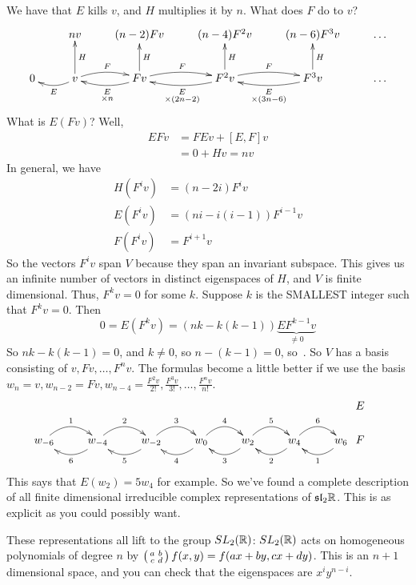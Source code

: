  We have that $E$ kills $v$, and $H$ multiplies it by $n$. What does $F$ do to $v$?
 \[\xymatrix{
  & nv & (n-2)Fv & (n-4)F^2v & (n-6)F^3v & \dots\\
  0 & v\ar@/^/[l]^E \ar[u]_H \ar@/^/[r]^F &
  Fv \ar@/^/[l]^{\substack{E\\ \times n}} \ar[u]_H \ar@/^/[r]^F &
  F^2v \ar@/^/[l]^{\substack{E \\ \times (2n-2)}} \ar[u]_H \ar@/^/[r]^F &
  F^3v \ar@/^/[l]^{\substack{E\\ \times (3n-6)}} \ar[u]_H & \dots
 }\]
 What is $E(Fv)$? Well,
 \begin{align*}
   EFv &= FEv + [E,F]v\\
        &= 0 + Hv = nv
 \end{align*}
 In general, we have
 \begin{align*}
   H(F^i v) &= (n-2i)F^i v\\
   E(F^i v) &= (ni-i(i-1))F^{i-1}v\\
   F(F^i v) &= F^{i+1} v
 \end{align*}
 So the vectors $F^i v$ span $V$ because they span an invariant subspace. This gives
 us an infinite number of vectors in distinct eigenspaces of $H$, and $V$ is
 finite dimensional. Thus, $F^k v=0$ for some $k$. Suppose $k$ is the SMALLEST integer
 such that $F^kv=0$. Then
 \[
    0 = E(F^k v) = (nk-k(k-1))\underbrace{EF^{k-1}v}_{\neq 0}
 \]
 So $nk-k(k-1)=0$, and $k\neq 0$, so $n-(k-1)=0$, so \,. So $V$ has a
 basis consisting of $v,Fv,\dots, F^n v$. The formulas become a little better if we
 use the basis $w_n=v,w_{n-2}=Fv, w_{n-4}=\frac{F^2v}{2!}, \frac{F^3 v}{3!}, \dots,
 \frac{F^nv}{n!}$.
 \[\xymatrix{
  w_{-6} \ar@/^1.25em/[r]^1 \ar@/_1.25em/@{<-}[r]_6 &
  w_{-4} \ar@/^1.25em/[r]^2 \ar@/_1.25em/@{<-}[r]_5 &
  w_{-2} \ar@/^1.25em/[r]^3 \ar@/_1.25em/@{<-}[r]_4 &
  w_{0}  \ar@/^1.25em/[r]^4 \ar@/_1.25em/@{<-}[r]_3 &
  w_{2}  \ar@/^1.25em/[r]^5 \ar@/_1.25em/@{<-}[r]_2 &
  w_{4}  \ar@/^1.25em/[r]^6 \ar@/_1.25em/@{<-}[r]_1 &
  w_{6} & \hspace{-3.75em} \shortstack{$E$\\ \vspace{1.75em} \\$F$}
 }\]
 This says that $E(w_2)=5w_4$ for example. So we've found a complete description of
 all finite dimensional irreducible complex representations of $\mathfrak{sl}_2 \mathbb{R}$. This is as
 explicit as you could possibly want.

 These representations all lift to the group $SL_2(\mathbb{R})$: $SL_2(\mathbb{R})$ acts on
 homogeneous polynomials of degree $n$ by $\left( \begin{smallmatrix} a & b \\ c & d \end{smallmatrix} \right) f(x,y)=f(ax+by,cx+dy)$. This
 is an $n+1$ dimensional space, and you can check that the eigenspaces are $x^i
 y^{n-i}$.

